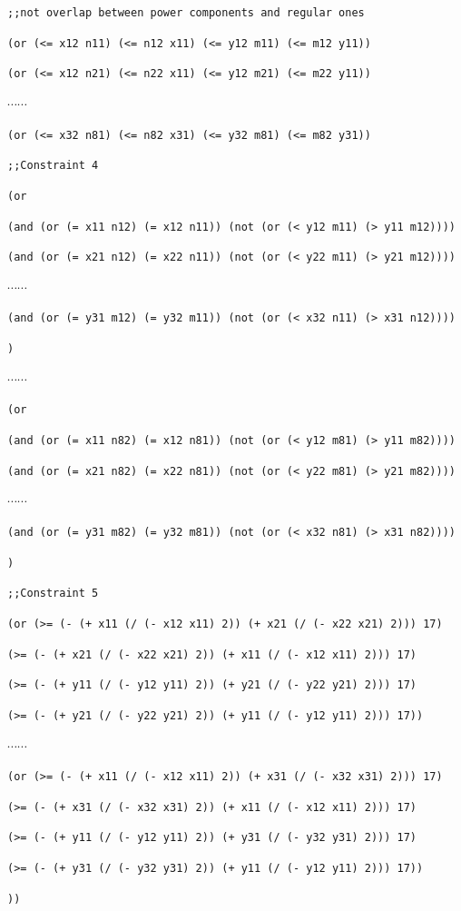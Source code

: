 {{\tt ;;not overlap between power components and regular ones}

{\tt (or (<= x12 n11) (<= n12 x11) (<= y12 m11) (<= m12 y11))}

{\tt (or (<= x12 n21) (<= n22 x11) (<= y12 m21) (<= m22 y11))}

$\cdots \cdots$

{\tt (or (<= x32 n81) (<= n82 x31) (<= y32 m81) (<= m82 y31))}

{\tt ;;Constraint 4}

{\tt (or}

{\tt (and (or (= x11 n12) (= x12 n11)) (not (or (< y12 m11) (> y11 m12))))}

{\tt (and (or (= x21 n12) (= x22 n11)) (not (or (< y22 m11) (> y21 m12))))}

$\cdots \cdots$

{\tt (and (or (= y31 m12) (= y32 m11)) (not (or (< x32 n11) (> x31 n12))))}

{\tt )}

$\cdots \cdots$

{\tt (or}

{\tt (and (or (= x11 n82) (= x12 n81)) (not (or (< y12 m81) (> y11 m82))))}

{\tt (and (or (= x21 n82) (= x22 n81)) (not (or (< y22 m81) (> y21 m82))))}

$\cdots \cdots$

{\tt (and (or (= y31 m82) (= y32 m81)) (not (or (< x32 n81) (> x31 n82))))}

{\tt )}

{\tt ;;Constraint 5}

{\tt (or (>= (- (+ x11 (/ (- x12 x11) 2)) (+ x21 (/ (- x22 x21) 2))) 17)}

{\tt (>= (- (+ x21 (/ (- x22 x21) 2)) (+ x11 (/ (- x12 x11) 2))) 17)}

{\tt (>= (- (+ y11 (/ (- y12 y11) 2)) (+ y21 (/ (- y22 y21) 2))) 17)}

{\tt (>= (- (+ y21 (/ (- y22 y21) 2)) (+ y11 (/ (- y12 y11) 2))) 17))}

$\cdots \cdots$

{\tt (or (>= (- (+ x11 (/ (- x12 x11) 2)) (+ x31 (/ (- x32 x31) 2))) 17)}

{\tt (>= (- (+ x31 (/ (- x32 x31) 2)) (+ x11 (/ (- x12 x11) 2))) 17)}

{\tt (>= (- (+ y11 (/ (- y12 y11) 2)) (+ y31 (/ (- y32 y31) 2))) 17)}

{\tt (>= (- (+ y31 (/ (- y32 y31) 2)) (+ y11 (/ (- y12 y11) 2))) 17))}

{\tt ))}
}

